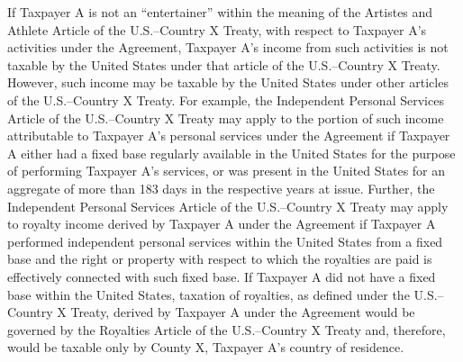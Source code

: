 \begin{select}
If Taxpayer A is not an ``entertainer'' within the meaning of the Artistes and
Athlete Article of the U.S.--Country X Treaty, with respect to Taxpayer A's activities 
under the Agreement, Taxpayer A's income from such activities is not taxable by
the United States under that article of the U.S.--Country X Treaty. However, such
income may be taxable by the United States under other articles of the U.S.--Country X Treaty. For example, the Independent Personal Services Article of the
U.S.--Country X Treaty may apply to the portion of such income attributable to
Taxpayer A's personal services under the Agreement if Taxpayer A either had a
fixed base regularly available in the United States for the purpose of performing
Taxpayer A's services, or was present in the United States for an aggregate of
more than 183 days in the respective years at issue. Further, the Independent
Personal Services Article of the U.S.--Country X Treaty may apply to royalty income
derived by Taxpayer A under the Agreement if Taxpayer A performed independent
personal services within the United States from a fixed base and the right or
property with respect to which the royalties are paid is effectively connected with
such fixed base. If Taxpayer A did not have a fixed base within the United States,
taxation of royalties, as defined under the U.S.--Country X Treaty, derived by
Taxpayer A under the Agreement would be governed by the Royalties Article of the
U.S.--Country X Treaty and, therefore, would be taxable only by County X, Taxpayer
A's country of residence.

\end{select}

